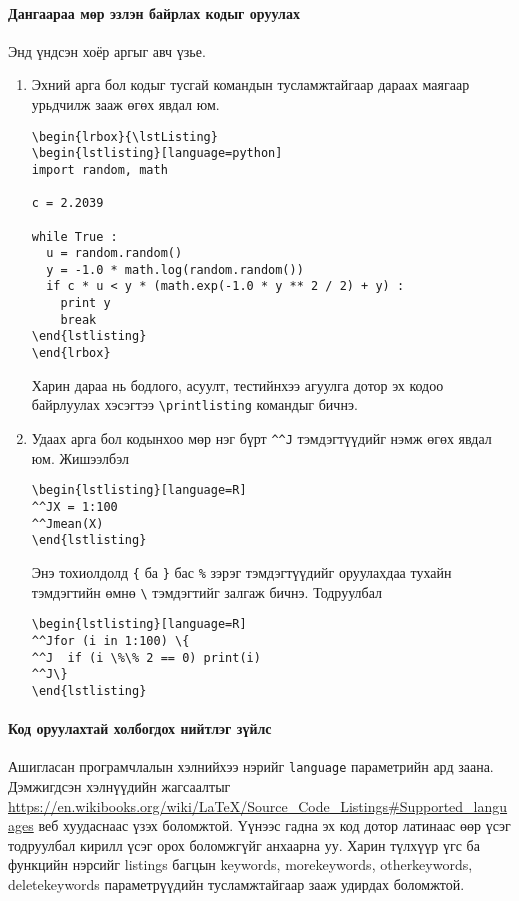 \documentclass[10pt]{article}
\theoremstyle{definition}
\begin{document}
\paragraph{Дангаараа мөр эзлэн байрлах кодыг оруулах} Энд үндсэн хоёр аргыг авч үзье.
\begin{enumerate}
\item Эхний арга бол кодыг тусгай командын тусламжтайгаар дараах маягаар урьдчилж зааж өгөх явдал юм.
\begin{verbatim}
\begin{lrbox}{\lstListing}
\begin{lstlisting}[language=python]
import random, math

c = 2.2039

while True :
  u = random.random()
  y = -1.0 * math.log(random.random())
  if c * u < y * (math.exp(-1.0 * y ** 2 / 2) + y) :
    print y
    break
\end{lstlisting}
\end{lrbox}
\end{verbatim}
Харин дараа нь бодлого, асуулт, тестийнхээ агуулга дотор эх кодоо байрлуулах хэсэгтээ \verb|\printlisting| командыг бичнэ.
\item Удаах арга бол кодынхоо мөр нэг бүрт \verb|^^J| тэмдэгтүүдийг нэмж өгөх явдал юм.
Жишээлбэл
\begin{verbatim}
\begin{lstlisting}[language=R]
^^JX = 1:100
^^Jmean(X)
\end{lstlisting}
\end{verbatim}
Энэ тохиолдолд \verb|{| ба \verb|}| бас \verb|%| зэрэг тэмдэгтүүдийг оруулахдаа тухайн тэмдэгтийн өмнө \verb|\| тэмдэгтийг залгаж бичнэ. Тодруулбал
\begin{verbatim}
\begin{lstlisting}[language=R]
^^Jfor (i in 1:100) \{
^^J  if (i \%\% 2 == 0) print(i)
^^J\}
\end{lstlisting}
\end{verbatim}
\end{enumerate}

\paragraph{Код оруулахтай холбогдох нийтлэг зүйлс} Ашигласан програмчлалын хэлнийхээ нэрийг \texttt{language} параметрийн ард заана. Дэмжигдсэн хэлнүүдийн жагсаалтыг \url{https://en.wikibooks.org/wiki/LaTeX/Source_Code_Listings#Supported_languages} веб хуудаснаас үзэх боломжтой. Үүнээс гадна эх код дотор латинаас өөр үсэг тодруулбал кирилл үсэг орох боломжгүйг анхаарна уу. Харин түлхүүр үгс ба функцийн нэрсийг listings багцын keywords, morekeywords, otherkeywords, deletekeywords параметрүүдийн тусламжтайгаар зааж удирдах боломжтой.
\end{document}
